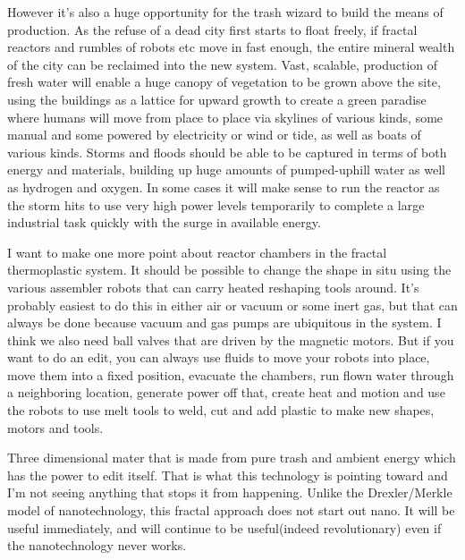 However it's also a huge opportunity for the trash wizard to build the
means of production. As the refuse of a dead city first starts to float
freely, if fractal reactors and rumbles of robots etc move in fast
enough, the entire mineral wealth of the city can be reclaimed into the
new system. Vast, scalable, production of fresh water will enable a huge
canopy of vegetation to be grown above the site, using the buildings as
a lattice for upward growth to create a green paradise where humans will
move from place to place via skylines of various kinds, some manual and
some powered by electricity or wind or tide, as well as boats of various
kinds. Storms and floods should be able to be captured in terms of both
energy and materials, building up huge amounts of pumped-uphill water as
well as hydrogen and oxygen. In some cases it will make sense to run the
reactor as the storm hits to use very high power levels temporarily to
complete a large industrial task quickly with the surge in available
energy.

I want to make one more point about reactor chambers in the fractal
thermoplastic system. It should be possible to change the shape in situ
using the various assembler robots that can carry heated reshaping tools
around. It's probably easiest to do this in either air or vacuum or some
inert gas, but that can always be done because vacuum and gas pumps are
ubiquitous in the system. I think we also need ball valves that are
driven by the magnetic motors. But if you want to do an edit, you can
always use fluids to move your robots into place, move them into a fixed
position, evacuate the chambers, run flown water through a neighboring
location, generate power off that, create heat and motion and use the
robots to use melt tools to weld, cut and add plastic to make new
shapes, motors and tools.

Three dimensional mater that is made from pure trash and ambient energy
which has the power to edit itself. That is what this technology is
pointing toward and I'm not seeing anything that stops it from
happening. Unlike the Drexler/Merkle model of nanotechnology, this
fractal approach does not start out nano. It will be useful immediately,
and will continue to be useful(indeed revolutionary) even if the
nanotechnology never works.

